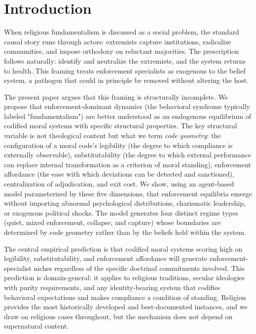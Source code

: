 \documentclass[12pt]{article}
\begin{document}
\section{Introduction}

When religious fundamentalism is discussed as a social problem, the standard causal story runs through actors: extremists capture institutions, radicalize communities, and impose orthodoxy on reluctant majorities. The prescription follows naturally: identify and neutralize the extremists, and the system returns to health. This framing treats enforcement specialists as exogenous to the belief system, a pathogen that could in principle be removed without altering the host.

The present paper argues that this framing is structurally incomplete. We propose that enforcement-dominant dynamics (the behavioral syndrome typically labeled "fundamentalism") are better understood as an endogenous equilibrium of codified moral systems with specific structural properties. The key structural variable is not theological content but what we term \emph{code geometry}: the configuration of a moral code's legibility (the degree to which compliance is externally observable), substitutability (the degree to which external performance can replace internal transformation as a criterion of moral standing), enforcement affordance (the ease with which deviations can be detected and sanctioned), centralization of adjudication, and exit cost. We show, using an agent-based model parameterized by these five dimensions, that enforcement equilibria emerge without importing abnormal psychological distributions, charismatic leadership, or exogenous political shocks. The model generates four distinct regime types (quiet, mixed enforcement, collapse, and capture) whose boundaries are determined by code geometry rather than by the beliefs held within the system.

The central empirical prediction is that codified moral systems scoring high on legibility, substitutability, and enforcement affordance will generate enforcement-specialist niches regardless of the specific doctrinal commitments involved. This prediction is domain-general: it applies to religious traditions, secular ideologies with purity requirements, and any identity-bearing system that codifies behavioral expectations and makes compliance a condition of standing. Religion provides the most historically developed and best-documented instances, and we draw on religious cases throughout, but the mechanism does not depend on supernatural content.
\end{document}
